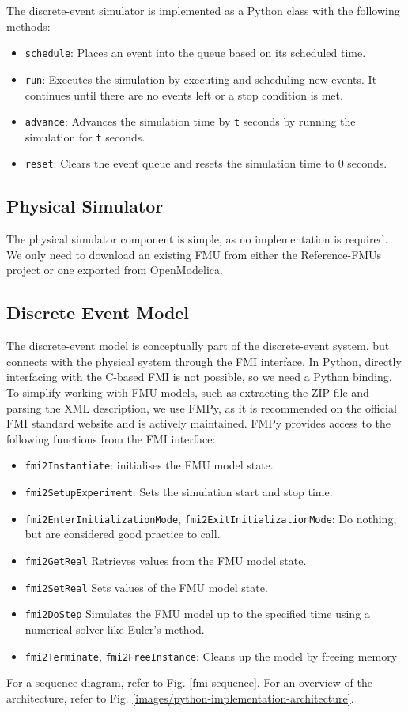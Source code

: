 \documentclass[conference]{IEEEtran}
\begin{document}
The discrete-event simulator is implemented as a Python class with the following methods:
\begin{itemize}
    \item \texttt{schedule}: Places an event into the queue based on its scheduled time.
    \item \texttt{run}: Executes the simulation by executing and scheduling new events. It continues until there are no events left or a stop condition is met.
    \item \texttt{advance}: Advances the simulation time by \texttt{t} seconds by running the simulation for \texttt{t} seconds.
    \item \texttt{reset}: Clears the event queue and resets the simulation time to 0 seconds.
\end{itemize}

\subsection{Physical Simulator}

The physical simulator component is simple, as no implementation is required. We only need to download an existing FMU from either the Reference-FMUs project or one exported from OpenModelica.

\subsection{Discrete Event Model}

The discrete-event model is conceptually part of the discrete-event system,
but connects with the physical system through the FMI interface.
In Python, directly interfacing with the C-based FMI is not possible,
so we need a Python binding.
To simplify working with FMU models, such as extracting the ZIP file and parsing the XML description, we use FMPy,
as it is recommended on the official FMI standard website
and is actively maintained.
FMPy provides access to the following functions from the FMI interface:
\begin{itemize}
    \item \texttt{fmi2Instantiate}: initialises the FMU model state.
    \item \texttt{fmi2SetupExperiment}: Sets the simulation start and stop time.
    \item \texttt{fmi2EnterInitializationMode}, \texttt{fmi2ExitInitializationMode}: Do nothing, but are considered good practice to call.
    \item \texttt{fmi2GetReal} Retrieves values from the FMU model state.
    \item \texttt{fmi2SetReal} Sets values of the FMU model state.
    \item \texttt{fmi2DoStep} Simulates the FMU model up to the specified time using a numerical solver like Euler's method.
    \item \texttt{fmi2Terminate}, \texttt{fmi2FreeInstance}: Cleans up the model by freeing memory 
    
\end{itemize}
For a sequence diagram, refer to Fig. \ref{fmi-sequence}.
For an overview of the architecture, refer to Fig. \ref{images/python-implementation-architecture}.
\end{document}
